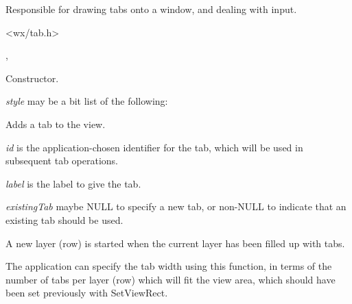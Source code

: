 Responsible for drawing tabs onto a window, and dealing with input.




<wx/tab.h>


, 




Constructor.

{\it style} may be a bit list of the following:

\begin{twocollist}\itemsep=0pt
\end{twocollist}

\label{wxtabviewaddtab}


Adds a tab to the view.

{\it id} is the application-chosen identifier for the tab, which will be used in subsequent tab operations.

{\it label} is the label to give the tab.

{\it existingTab} maybe NULL to specify a new tab, or non-NULL to indicate that an existing tab should be used.

A new layer (row) is started when the current layer has been filled up with tabs.

\label{wxtabviewcalculatetabwidth}


The application can specify the tab width using this function, in terms
of the number of tabs per layer (row) which will fit the view area, which
should have been set previously with SetViewRect.

